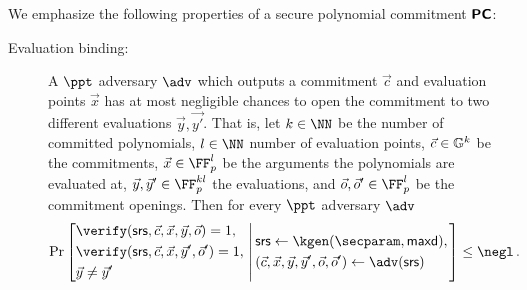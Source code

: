 \documentclass[runningheads,11pt]{llncs}
\let\spvec\vec \let\vec\accentvec
\let\vec\spvec
\begin{document}
We emphasize the following properties of a secure polynomial commitment
$\bm{\mathsf{PC}}$:
\begin{description}
\item[Evaluation binding:] A $\ppt$ adversary $\adv$ which outputs a commitment
  $\vec{c}$ and evaluation points $\vec{x}$ has at most negligible chances to
  open the commitment to two different evaluations $\vec{y}, \vec{y'}$. That is,
  let $k \in \NN$ be the number of committed polynomials, $l \in \NN$ number of
  evaluation points, $\vec{c} \in \GRP^k$ be the commitments,
  $\vec{x} \in \FF_p^l$ be the arguments the polynomials are evaluated at,
  $\vec{y},\vec{y}' \in \FF_p^{kl}$ the evaluations, and
  $\vec{o},\vec{o}' \in \FF_p^l$ be the commitment openings. Then for every
  $\ppt$ adversary $\adv$
	\[
		\Pr
			\left[
			\begin{aligned}
				& \verify(\srs, \vec{c}, \vec{x}, \vec{y}, \vec{o}) = 1,  \\
				& \verify(\srs, \vec{c}, \vec{x}, \vec{y}', \vec{o}') = 1, \\
				& \vec{y} \neq \vec{y}'
			\end{aligned}
			\,\left|\,\vphantom{\begin{aligned}
                  & \\
                  & \\
                  &
                \end{aligned}}
			\begin{aligned}
				& \srs \gets \kgen(\secparam, \maxdeg),\\
				& (\vec{c}, \vec{x}, \vec{y}, \vec{y}', \vec{o}, \vec{o}') \gets \adv(\srs)
			\end{aligned}
			\right.\right] \leq \negl\,.
	\]

\end{description}
	
\end{document}
